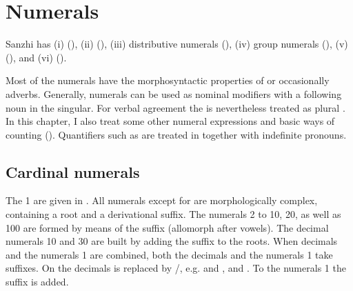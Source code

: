 \chapter{Numerals}
\label{cpt:numerals}

Sanzhi has (i)  (), (ii)  (), (iii) distributive numerals (), (iv) group numerals (), (v)  (), and (vi)  ().

Most of the numerals have the morphosyntactic properties of  or occasionally adverbs. Generally, numerals can be used as nominal modifiers with a following noun in the singular. For verbal agreement the  is nevertheless treated as plural . In this chapter, I also treat some other numeral expressions and basic ways of counting (). Quantifiers such as  are treated in  together with indefinite pronouns.




\section{Cardinal numerals}
\label{sec:cardinalnumerals}

The  1 are given in . All numerals except for   are morphologically complex, containing a root and a derivational suffix. The numerals 2 to 10, 20, as well as 100 are formed by means of the suffix  (allomorph  after vowels). The decimal numerals 10 and 30 are built by adding the suffix  to the roots. When decimals and the numerals 1 are combined, both the decimals and the numerals 1 take suffixes. On the decimals  is replaced by \slash{}, e.g.   and ,   and . To the numerals 1 the suffix  is added.

